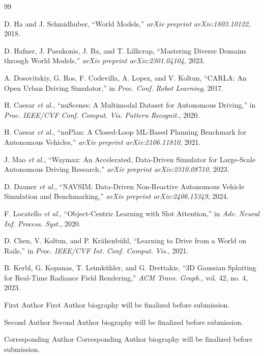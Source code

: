 \documentclass[journal]{IEEEtran}
\begin{document}
\begin{thebibliography}{99}

D. Ha and J. Schmidhuber, ``World Models,'' \emph{arXiv preprint arXiv:1803.10122}, 2018.

D. Hafner, J. Pasukonis, J. Ba, and T. Lillicrap, ``Mastering Diverse Domains through World Models,'' \emph{arXiv preprint arXiv:2301.04104}, 2023.

A. Dosovitskiy, G. Ros, F. Codevilla, A. Lopez, and V. Koltun, ``CARLA: An Open Urban Driving Simulator,'' in \emph{Proc. Conf. Robot Learning}, 2017.

H. Caesar \emph{et al.}, ``nuScenes: A Multimodal Dataset for Autonomous Driving,'' in \emph{Proc. IEEE/CVF Conf. Comput. Vis. Pattern Recognit.}, 2020.

H. Caesar \emph{et al.}, ``nuPlan: A Closed-Loop ML-Based Planning Benchmark for Autonomous Vehicles,'' \emph{arXiv preprint arXiv:2106.11810}, 2021.

J. Mao \emph{et al.}, ``Waymax: An Accelerated, Data-Driven Simulator for Large-Scale Autonomous Driving Research,'' \emph{arXiv preprint arXiv:2310.08710}, 2023.

D. Dauner \emph{et al.}, ``NAVSIM: Data-Driven Non-Reactive Autonomous Vehicle Simulation and Benchmarking,'' \emph{arXiv preprint arXiv:2406.15349}, 2024.

F. Locatello \emph{et al.}, ``Object-Centric Learning with Slot Attention,'' in \emph{Adv. Neural Inf. Process. Syst.}, 2020.

D. Chen, V. Koltun, and P. Kr{\"a}henb{\"u}hl, ``Learning to Drive from a World on Rails,'' in \emph{Proc. IEEE/CVF Int. Conf. Comput. Vis.}, 2021.

B. Kerbl, G. Kopanas, T. Leimk{\"u}hler, and G. Drettakis, ``3D Gaussian Splatting for Real-Time Radiance Field Rendering,'' \emph{ACM Trans. Graph.}, vol. 42, no. 4, 2023.

\end{thebibliography}

\begin{IEEEbiographynophoto}{First Author}
First Author biography will be finalized before submission.
\end{IEEEbiographynophoto}

\begin{IEEEbiographynophoto}{Second Author}
Second Author biography will be finalized before submission.
\end{IEEEbiographynophoto}

\begin{IEEEbiographynophoto}{Corresponding Author}
Corresponding Author biography will be finalized before submission.
\end{IEEEbiographynophoto}
\end{document}
